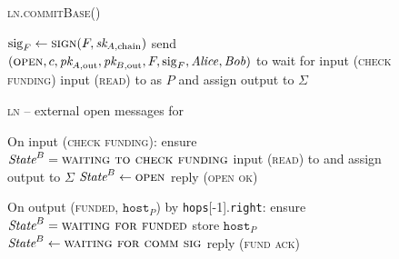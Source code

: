\begin{figure}[H]
  \begin{processbox}{\textsc{ln.commitBase}()}
    \begin{algorithmic}[1]
      \State $\mathrm{sig}_F \gets \textsc{sign}(F, \textit{sk}_{A, \mathrm{chain}})$
      \label{code:ln:base:sign-funding}
      \State send $(\textsc{open}, c, \textit{pk}_{A, \mathrm{out}}, \textit{pk}_{B,
      \mathrm{out}}, F, \mathrm{sig}_F, \mathit{Alice}, \mathit{Bob})$ to \adversary
        \State wait for input (\textsc{check funding}) 
        \State input (\textsc{read}) to \ledger as $P$ and assign output to
        $\Sigma$
      \EndWhile
    \end{algorithmic}
  \end{processbox}
  \caption{}
  \label{code:ln:commit-base}
\end{figure}

\begin{figure}[H]
  \begin{processbox}{\textsc{ln} -- external open messages for \bob}
    \begin{algorithmic}[1]
      \State On input (\textsc{check funding}): 
      \Indent
        \State ensure $\textit{State}^B = \textsc{waiting to check funding}$
        \State input (\textsc{read}) to \ledger and assign output to $\Sigma$
          \State $\textit{State}^B \gets \textsc{open}$
          \State reply (\textsc{open ok})
        \EndIf
      \EndIndent
      \Statex

      \State On output (\textsc{funded}, $\texttt{host}_P$) by
      \texttt{hops}[-1].\texttt{right}: 
      \Indent
        \State ensure $\textit{State}^B = \textsc{waiting for funded}$
        \State store $\texttt{host}_P$ 
        \State $\textit{State}^B \gets \textsc{waiting for comm sig}$
        \State reply (\textsc{fund ack})
      \EndIndent
    \end{algorithmic}
  \end{processbox}
  \caption{}
  \label{code:ln:bob}
\end{figure}

